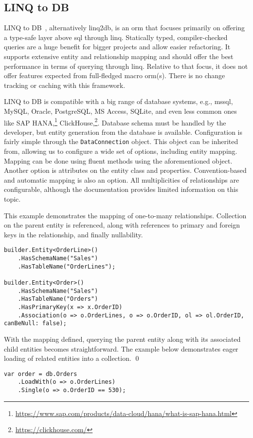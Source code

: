 \subsection{LINQ to DB}
\label{section:linqToDb}

LINQ to DB~\cite{linq2db, linq2dbRepo}, alternatively linq2db, is an \acrshort{orm} that focuses primarily on offering a type-safe layer above \acrshort{sql} through \acrshort{linq}. Statically typed, compiler-checked queries are a huge benefit for bigger projects and allow easier refactoring. It supports extensive entity and relationship mapping and should offer the best performance in terms of querying through \acrshort{linq}. Relative to that focus, it does not offer features expected from full-fledged macro \acrshort{orm}(s). There is no change tracking or caching with this framework.

LINQ to DB is compatible with a big range of database systems, e.g., \acrshort{mssql}, MySQL, Oracle, PostgreSQL, MS Access, SQLite, and even less common ones like SAP HANA,\footnote{\url{https://www.sap.com/products/data-cloud/hana/what-is-sap-hana.html}} ClickHouse,\footnote{\url{https://clickhouse.com/}}. Database schema must be handled by the developer, but entity generation from the database is available. Configuration is fairly simple through the \texttt{DataConnection} object. This object can be inherited from, allowing us to configure a wide set of options, including entity mapping. Mapping can be done using fluent methods using the aforementioned object. Another option is attributes on the entity class and properties. Convention-based and automatic mapping is also an option. All multiplicities of relationships are configurable, although the documentation provides limited information on this topic. 

\begin{example}
\small
This example demonstrates the mapping of one-to-many relationships. Collection on the parent entity is referenced, along with references to primary and foreign keys in the relationship, and finally nullability.

\begin{lstlisting}[language=CSharp]
builder.Entity<OrderLine>()
    .HasSchemaName("Sales")
    .HasTableName("OrderLines");

builder.Entity<Order>()
    .HasSchemaName("Sales")
    .HasTableName("Orders")
    .HasPrimaryKey(x => x.OrderID)
    .Association(o => o.OrderLines, o => o.OrderID, ol => ol.OrderID, canBeNull: false);
\end{lstlisting}

\small With the mapping defined, querying the parent entity along with its associated child entities becomes straightforward. The example below demonstrates eager loading of related entities into a collection.
\qed

\begin{lstlisting}[language=CSharp]
var order = db.Orders
    .LoadWith(o => o.OrderLines)
    .Single(o => o.OrderID == 530);
\end{lstlisting}
\end{example}

